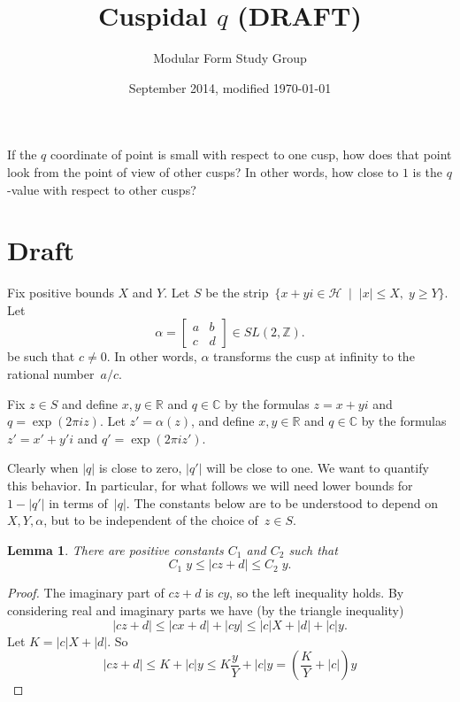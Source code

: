 \documentclass {amsart}
\theoremstyle{plain}
\newtheorem{lemma}[proposition]{Lemma}
\theoremstyle{definition}
\theoremstyle{remark}
\newcommand{\bZ}{{\mathbb{Z}}}
\newcommand{\bR}{{\mathbb{R}}}
\newcommand{\bC}{{\mathbb{C}}}
\newcommand{\h}{{\mathcal{H}}}
\begin{document}
 

\title{Cuspidal $q$ (DRAFT)}

\author{Modular Form Study Group}

\date{September 2014, modified \today}

\maketitle


If the $q$ coordinate of point is small with respect to one cusp, how does that point look from the point of view of other cusps? In other words, how close to $1$ is the $q$-value with respect to other cusps?

\section{Draft}




Fix positive bounds $X$ and $Y$.
Let $S$ be the strip~$\{ x + y i \in \h \; \mid \; |x| \le X, \; y \ge Y \}$.
Let
$$ \alpha = \begin{bmatrix}
       a & b         \\
       c & d
 \end{bmatrix}  \in SL (2, \bZ).$$
 be such that $c \ne 0$. In other words, $\alpha$ transforms
 the cusp at infinity to the rational number~$a/c$.

Fix $z \in S$ and define $x, y \in\bR$ and $q \in \bC$ by the formulas $z = x + y i$
and $q = \exp (2 \pi i z)$.
 Let $z' = \alpha(z)$, and define $x, y \in \bR$ and $q \in \bC$ by the formulas $z' = x '+ y' i$
and $q' = \exp (2 \pi i z')$.

Clearly when $|q|$ is close to zero, $|q'|$ will be close to one.  We want to quantify this behavior. In particular, for what follows we will need lower bounds for $1 - |q'|$ in terms of~$|q|$.
The constants below are to be understood to depend on $X, Y, \alpha$, but to be independent
of the choice of~$z \in S$.

\begin{lemma}\label{l1}
There are positive constants $C_1$ and $C_2$ such that
$$
C_1 \; y \le |c z + d| \le C_2\; y.
$$
\end{lemma}

\begin{proof}
The imaginary part of $c z + d$ is $c y$, so the left inequality holds.
By considering real and imaginary parts we have (by the triangle inequality)
$$
|c z + d | \le |c x + d| + |c y| \le |c| X + |d| + |c| y.
$$
Let $K = |c| X + |d|$. So
$$
|c z + d | \le K + |c| y \le K \frac{y}{Y} + |c| y  = \left( \frac{K}{Y} + |c|\right) y
$$
\end{proof}
\end{document}
